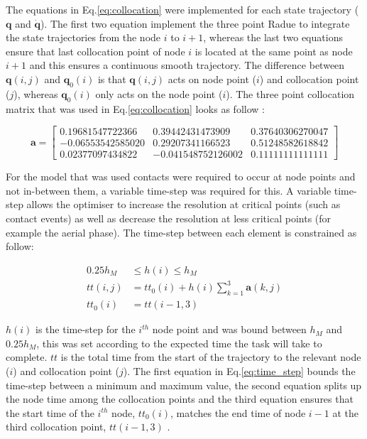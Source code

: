         The equations in Eq.\ref{eq:collocation} were implemented for each state trajectory ($\textbf{q}$ and $\dot{\textbf{q}}$). The first two equation implement the three point Radue to integrate the state trajectories from the node $i$ to $i+1$, whereas the last two equations ensure that last collocation point of node $i$ is located at the same point as node $i+1$ and this ensures a continuous smooth trajectory. The difference between $\textbf{q}(i,j)$ and $\textbf{q}_0(i)$ is that $\textbf{q}(i,j)$ acts on node point ($i$) and collocation point ($j$), whereas $\textbf{q}_0(i)$ only acts on the node point ($i$). The three point collocation matrix that was used in Eq.\ref{eq:collocation} looks as follow \cite{Fisher-2020}:
        
        \begin{equation} \label{eq:3p_matrix}
            \bm{a} = \begin{bmatrix}
                0.19681547722366 & 0.39442431473909 & 0.37640306270047 \\
                -0.06553542585020 & 0.29207341166523 & 0.51248582618842 \\
                0.02377097434822 & -0.041548752126002 & 0.11111111111111 
            \end{bmatrix}
        \end{equation}
        
        For the model that was used contacts were required to occur at node points and not in-between them, a variable time-step was required for this. A variable time-step allows the optimiser to increase the resolution at critical points (such as contact events) as well as decrease the resolution at less critical points (for example the aerial phase). The time-step between each element is constrained as follow:
        
        \begin{equation} \label{eq:time_step}
            \begin{split}
                0.25h_M &\leq h(i) \leq h_M \\
                tt(i,j) &= tt_0(i) + h(i) \sum^3_{k=1} \bm{a}(k,j) \\
                tt_0(i) &= tt(i - 1,3)
            \end{split}
        \end{equation}
        
        $h(i)$ is the time-step for the $i^{th}$ node point and was bound between $h_M$ and $0.25h_M$, this was set according to the expected time the task will take to complete. $tt$ is the total time from the start of the trajectory to the relevant node ($i$) and collocation point ($j$). The first equation in Eq.\ref{eq:time_step} bounds the time-step between a minimum and maximum value, the second equation splits up the node time among the collocation points and the third equation ensures that the start time of the $i^{th}$ node, $tt_0(i)$, matches the end time of node $i-1$ at the third collocation point, $tt(i-1,3)$ \cite{Fisher-2020}.
        
